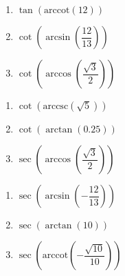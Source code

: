 \begin{multicols}{3}

\begin{enumerate}

\setcounter{enumi}{\value{HW}}

\item  $\tan\left(\text{arccot}\left( 12  \right)\right)$ 
\item  $\cot\left(\arcsin\left(\dfrac{12}{13}\right)\right)$ 
\item  $\cot\left(\arccos\left(\dfrac{\sqrt{3}}{2}\right)\right)$

\setcounter{HW}{\value{enumi}}

\end{enumerate}

\end{multicols}

\begin{multicols}{3}

\begin{enumerate}

\setcounter{enumi}{\value{HW}}

\item  $\cot\left(\text{arccsc}\left(\sqrt{5}\right)\right)$ 
\item  $\cot\left(\arctan \left( 0.25 \right)\right)$ 
\item  $\sec\left(\arccos\left(\dfrac{\sqrt{3}}{2}\right)\right)$

\setcounter{HW}{\value{enumi}}

\end{enumerate}

\end{multicols}

\begin{multicols}{3}

\begin{enumerate}

\setcounter{enumi}{\value{HW}}

\item  $\sec\left(\arcsin\left(-\dfrac{12}{13}\right)\right)$ 
\item  $\sec\left(\arctan\left(10\right)\right)$ 
\item  $\sec\left(\text{arccot}\left(-\dfrac{\sqrt{10}}{10}\right)\right)$

\setcounter{HW}{\value{enumi}}

\end{enumerate}

\end{multicols}

